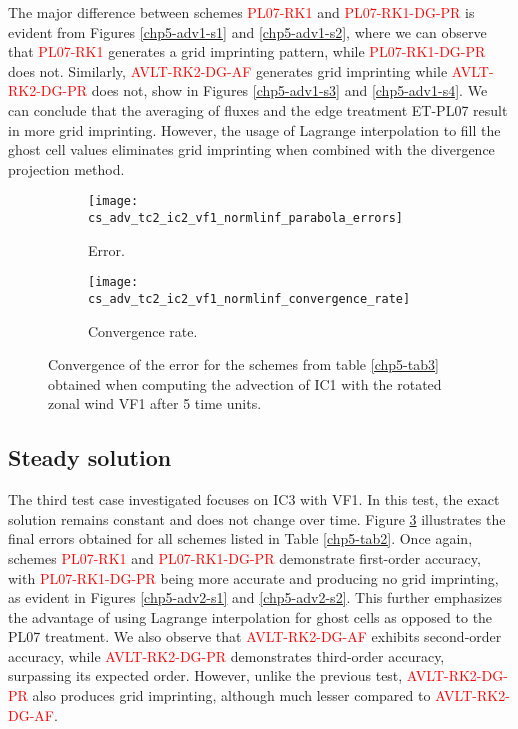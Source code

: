 The major difference between schemes \textcolor{red}{PL07-RK1} and \textcolor{red}{PL07-RK1-DG-PR} is evident from Figures \ref{chp5-adv1-s1} and
\ref{chp5-adv1-s2}, where we can observe that \textcolor{red}{PL07-RK1} generates a grid imprinting pattern, 
while \textcolor{red}{PL07-RK1-DG-PR} does not.
Similarly, \textcolor{red}{AVLT-RK2-DG-AF} generates grid imprinting while \textcolor{red}{AVLT-RK2-DG-PR} does not, 
show in Figures \ref{chp5-adv1-s3} and \ref{chp5-adv1-s4}.
We can conclude that the averaging of fluxes and the edge treatment ET-PL07 
result in more grid imprinting. However, the usage of Lagrange interpolation to fill the 
ghost cell values eliminates grid imprinting when combined with the divergence projection 
method.


\begin{figure}[!htb]
	\centering
	\begin{subfigure}{0.42\textwidth}
		\centering
		\texttt{[image: cs\_adv\_tc2\_ic2\_vf1\_normlinf\_parabola\_errors]}
		\caption{Error.\label{chp5-adv1-error}}
	\end{subfigure}
	\begin{subfigure}{0.42\textwidth}
		\centering
		\texttt{[image: cs\_adv\_tc2\_ic2\_vf1\_normlinf\_convergence\_rate]}
		\caption{Convergence rate.\label{chp5-adv1-cr}}
	\end{subfigure}
	\caption{Convergence of the error for the schemes from table \ref{chp5-tab3} obtained when computing the advection of IC1  with the rotated zonal wind VF1 after 5 time units.
	\label{chp5-error-adv1}}
\end{figure}


\subsection{Steady solution}
The third test case investigated focuses on IC3 with VF1. In this test, the exact solution 
remains constant and does not change over time. 
Figure \ref{chp5-error-adv1} illustrates 
the final errors obtained for all schemes listed in Table \ref{chp5-tab2}. Once again, 
schemes \textcolor{red}{PL07-RK1} and \textcolor{red}{PL07-RK1-DG-PR} demonstrate first-order accuracy, with \textcolor{red}{PL07-RK1-DG-PR} being more accurate and 
producing no grid imprinting, as evident in Figures \ref{chp5-adv2-s1} and 
\ref{chp5-adv2-s2}. This further emphasizes the advantage of using Lagrange interpolation 
for ghost cells as opposed to the PL07 treatment.
We also observe that \textcolor{red}{AVLT-RK2-DG-AF} exhibits second-order accuracy, while \textcolor{red}{AVLT-RK2-DG-PR} demonstrates 
third-order accuracy, surpassing its expected order. However, unlike the previous test, 
\textcolor{red}{AVLT-RK2-DG-PR} also produces grid imprinting, although much lesser compared to \textcolor{red}{AVLT-RK2-DG-AF}.


